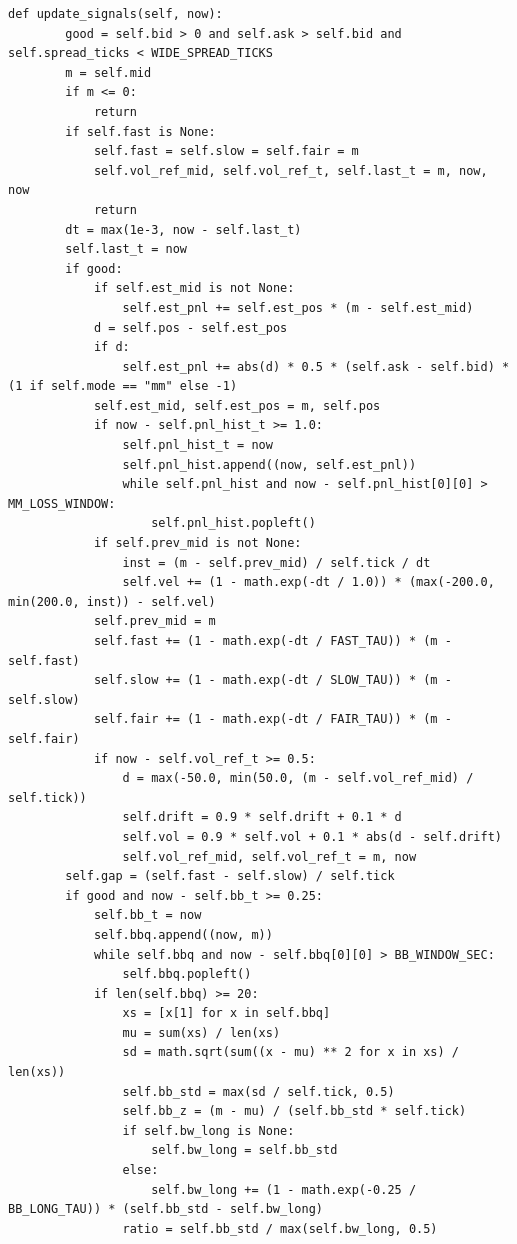 \begin{lstlisting}[style=algocode]
    def update_signals(self, now):
        good = self.bid > 0 and self.ask > self.bid and self.spread_ticks < WIDE_SPREAD_TICKS
        m = self.mid
        if m <= 0:
            return
        if self.fast is None:
            self.fast = self.slow = self.fair = m
            self.vol_ref_mid, self.vol_ref_t, self.last_t = m, now, now
            return
        dt = max(1e-3, now - self.last_t)
        self.last_t = now
        if good:
            if self.est_mid is not None:
                self.est_pnl += self.est_pos * (m - self.est_mid)
            d = self.pos - self.est_pos
            if d:
                self.est_pnl += abs(d) * 0.5 * (self.ask - self.bid) * (1 if self.mode == "mm" else -1)
            self.est_mid, self.est_pos = m, self.pos
            if now - self.pnl_hist_t >= 1.0:
                self.pnl_hist_t = now
                self.pnl_hist.append((now, self.est_pnl))
                while self.pnl_hist and now - self.pnl_hist[0][0] > MM_LOSS_WINDOW:
                    self.pnl_hist.popleft()
            if self.prev_mid is not None:
                inst = (m - self.prev_mid) / self.tick / dt
                self.vel += (1 - math.exp(-dt / 1.0)) * (max(-200.0, min(200.0, inst)) - self.vel)
            self.prev_mid = m
            self.fast += (1 - math.exp(-dt / FAST_TAU)) * (m - self.fast)
            self.slow += (1 - math.exp(-dt / SLOW_TAU)) * (m - self.slow)
            self.fair += (1 - math.exp(-dt / FAIR_TAU)) * (m - self.fair)
            if now - self.vol_ref_t >= 0.5:
                d = max(-50.0, min(50.0, (m - self.vol_ref_mid) / self.tick))
                self.drift = 0.9 * self.drift + 0.1 * d
                self.vol = 0.9 * self.vol + 0.1 * abs(d - self.drift)
                self.vol_ref_mid, self.vol_ref_t = m, now
        self.gap = (self.fast - self.slow) / self.tick
        if good and now - self.bb_t >= 0.25:
            self.bb_t = now
            self.bbq.append((now, m))
            while self.bbq and now - self.bbq[0][0] > BB_WINDOW_SEC:
                self.bbq.popleft()
            if len(self.bbq) >= 20:
                xs = [x[1] for x in self.bbq]
                mu = sum(xs) / len(xs)
                sd = math.sqrt(sum((x - mu) ** 2 for x in xs) / len(xs))
                self.bb_std = max(sd / self.tick, 0.5)
                self.bb_z = (m - mu) / (self.bb_std * self.tick)
                if self.bw_long is None:
                    self.bw_long = self.bb_std
                else:
                    self.bw_long += (1 - math.exp(-0.25 / BB_LONG_TAU)) * (self.bb_std - self.bw_long)
                ratio = self.bb_std / max(self.bw_long, 0.5)

\end{lstlisting}
